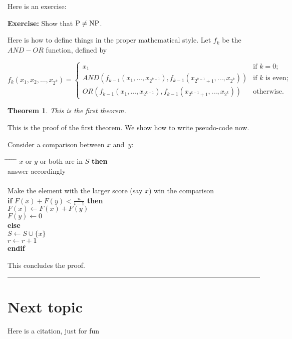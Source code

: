 \documentclass[twoside]{article}
\newcounter{lecnum}
\newtheorem{theorem}{Theorem}[lecnum]
\newenvironment{proof}{{\bf Proof:}}{\hfill\rule{2mm}{2mm}}
\begin{document}
Here is an exercise:

{\bf Exercise:}  Show that ${\rm P}\ne{\rm NP}$.

Here is how to define things in the proper mathematical style.
Let $f_k$ be the $AND-OR$ function, defined by

\[ f_k(x_1, x_2, \ldots, x_{2^k}) = \left\{ \begin{array}{ll}

	x_1 & \mbox{if $k = 0$;} \\

	AND(f_{k-1}(x_1, \ldots, x_{2^{k-1}}),
	   f_{k-1}(x_{2^{k-1} + 1}, \ldots, x_{2^k}))
	 & \mbox{if $k$ is even;} \\

	OR(f_{k-1}(x_1, \ldots, x_{2^{k-1}}),
	   f_{k-1}(x_{2^{k-1} + 1}, \ldots, x_{2^k}))	
	& \mbox{otherwise.} 
	\end{array}
	\right. \]

\begin{theorem}
This is the first theorem.
\end{theorem}

\begin{proof}
This is the proof of the first theorem. We show how to write pseudo-code now.

Consider a comparison between $x$ and~$y$:
\begin{tabbing}
\hspace*{.25in} \= \hspace*{.25in} \= \hspace*{.25in} \= \hspace*{.25in} \= \hspace*{.25in} \=\kill
{} $x$ or $y$ or both are in $S$ {\bf then } \\
\>\> answer accordingly \\
 \\
\>\>    Make the element with the larger score (say $x$) win the comparison \\
\>\> {\bf if} $F(x) + F(y) < \frac{n}{t-1}$ {\bf then} \\%
\>\>\> $F(x) \leftarrow F(x) + F(y)$ \\
\>\>\> $F(y) \leftarrow 0$ \\
\>\> {\bf else}  \\
\>\>\> $S \leftarrow S \cup \{ x \} $ \\
\>\>\> $r \leftarrow r+1$ \\
\>\> {\bf endif} \\
\end{tabbing}

This concludes the proof.
\end{proof}


\section{Next topic}

Here is a citation, just for fun~\citep{chen2013combinatorial}




\end{document}
